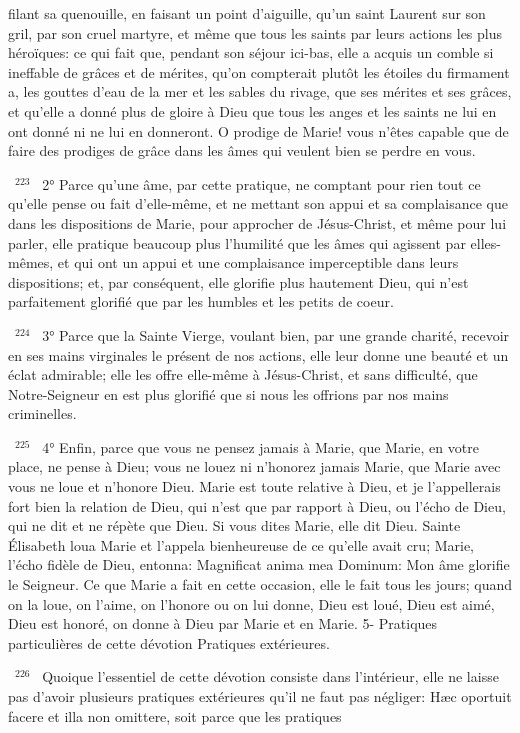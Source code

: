 \documentclass[paper=a5,pagesize=pdftex,fontsize=15pt,headinclude=on,twoside=off]{scrbook}
\newcommand{\negphantom}[1]{\settowidth{\dimen0}{#1}\hspace*{-\dimen0}}
\newcommand{\versenb}[1]{\par \vspace{10pt}~\negphantom{~${}^{#1}$~}${}^{#1}$~}
\begin{document}
filant sa quenouille, en faisant un point d'aiguille, qu'un saint Laurent sur son gril, par son cruel martyre, et même
que tous les saints par leurs actions les plus héroïques: ce qui fait que, pendant son séjour ici-bas, elle a acquis un
comble si ineffable de grâces et de mérites, qu'on compterait plutôt les étoiles du firmament a, les gouttes d'eau de
la mer et les sables du rivage, que ses mérites et ses grâces, et qu'elle a donné plus de gloire à Dieu que tous les
anges et les saints ne lui en ont donné ni ne lui en donneront. O prodige de Marie! vous n'êtes capable que de
faire des prodiges de grâce dans les âmes qui veulent bien se perdre en vous.
\versenb{223} 2° Parce qu'une âme, par cette pratique, ne comptant pour rien tout ce qu'elle pense ou fait d'elle-même, et
ne mettant son appui et sa complaisance que dans les dispositions de Marie, pour approcher de Jésus-Christ, et
même pour lui parler, elle pratique beaucoup plus l'humilité que les âmes qui agissent par elles-mêmes, et qui ont
un appui et une complaisance imperceptible dans leurs dispositions; et, par conséquent, elle glorifie plus
hautement Dieu, qui n'est parfaitement glorifié que par les humbles et les petits de coeur.
\versenb{224} 3° Parce que la Sainte Vierge, voulant bien, par une grande charité, recevoir en ses mains virginales le
présent de nos actions, elle leur donne une beauté et un éclat admirable; elle les offre elle-même à Jésus-Christ,
et sans difficulté, que Notre-Seigneur en est plus glorifié que si nous les offrions par nos mains criminelles.
\versenb{225} 4° Enfin, parce que vous ne pensez jamais à Marie, que Marie, en votre place, ne pense à Dieu; vous ne
louez ni n'honorez jamais Marie, que Marie avec vous ne loue et n'honore Dieu. Marie est toute relative à Dieu, et
je l'appellerais fort bien la relation de Dieu, qui n'est que par rapport à Dieu, ou l'écho de Dieu, qui ne dit et ne
répète que Dieu. Si vous dites Marie, elle dit Dieu. Sainte Élisabeth loua Marie et l'appela bienheureuse de ce
qu'elle avait cru; Marie, l'écho fidèle de Dieu, entonna: Magnificat anima mea Dominum: Mon âme glorifie le
Seigneur. Ce que Marie a fait en cette occasion, elle le fait tous les jours; quand on la loue, on l'aime, on l'honore
ou on lui donne, Dieu est loué, Dieu est aimé, Dieu est honoré, on donne à Dieu par Marie et en Marie.
5- Pratiques particulières de cette dévotion
Pratiques extérieures.
\versenb{226} Quoique l'essentiel de cette dévotion consiste dans l'intérieur, elle ne laisse pas d'avoir plusieurs pratiques
extérieures qu'il ne faut pas négliger: Hæc oportuit facere et illa non omittere, soit parce que les pratiques
\end{document}
